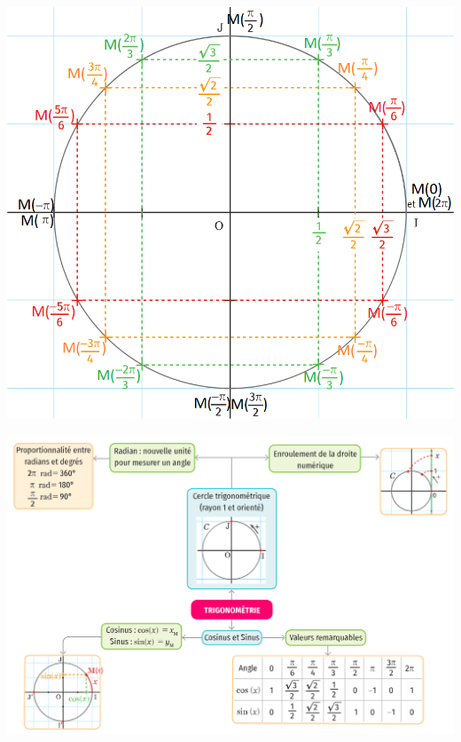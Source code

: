 \documentclass[a4paper,11pt,cours]{nsi} %
\begin{document}
\begin{center}
\includegraphics[width=14cm]{cercletrigo}
\end{center}



\begin{aretenir}
	\includegraphics[width=16cm]{cartementale}
\end{aretenir}
\end{document}
